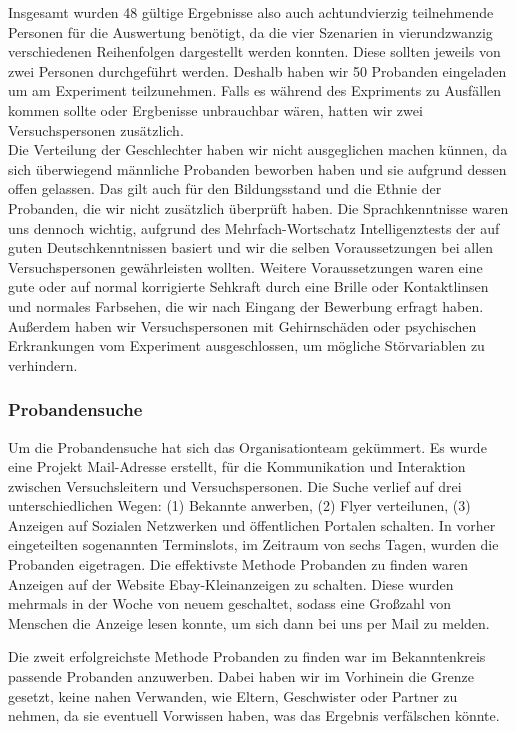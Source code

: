 \documentclass{Bericht}
\begin{document}
Insgesamt wurden 48 gültige Ergebnisse also auch achtundvierzig teilnehmende Personen für die Auswertung benötigt, da die vier Szenarien in vierundzwanzig verschiedenen Reihenfolgen dargestellt werden konnten. Diese sollten jeweils von zwei Personen durchgeführt werden. Deshalb haben wir 50 Probanden eingeladen um am Experiment teilzunehmen. Falls es während des Expriments zu Ausfällen kommen sollte oder Ergbenisse unbrauchbar wären, hatten wir zwei Versuchspersonen zusätzlich. \\

Die Verteilung der Geschlechter haben wir nicht ausgeglichen machen künnen, da sich überwiegend männliche Probanden beworben haben und sie aufgrund dessen offen gelassen. Das gilt auch für den Bildungsstand und die Ethnie der Probanden, die wir nicht zusätzlich überprüft haben. Die Sprachkenntnisse waren uns dennoch wichtig, aufgrund des Mehrfach-Wortschatz Intelligenztests der auf guten Deutschkenntnissen basiert und wir die selben Voraussetzungen bei allen Versuchspersonen gewährleisten wollten. Weitere Voraussetzungen waren eine gute oder auf normal korrigierte Sehkraft durch eine Brille oder Kontaktlinsen und normales Farbsehen, die wir nach Eingang der Bewerbung erfragt haben. Außerdem haben wir Versuchspersonen mit Gehirnschäden oder psychischen Erkrankungen vom Experiment ausgeschlossen, um mögliche Störvariablen zu verhindern. 

\subsubsection{Probandensuche} 

Um die Probandensuche hat sich das Organisationteam gekümmert. Es wurde eine Projekt Mail-Adresse erstellt, für die Kommunikation und Interaktion zwischen Versuchsleitern und Versuchspersonen. Die Suche verlief auf drei unterschiedlichen Wegen: (1) Bekannte anwerben, (2) Flyer verteilunen, (3) Anzeigen auf Sozialen Netzwerken und öffentlichen Portalen schalten. In vorher eingeteilten sogenannten \glqq Terminslots\grqq{}, im Zeitraum von sechs Tagen, wurden die Probanden eigetragen. Die effektivste Methode Probanden zu finden waren Anzeigen auf der Website \glqq Ebay-Kleinanzeigen\grqq{} zu schalten. Diese wurden mehrmals in der Woche von neuem geschaltet, sodass eine Großzahl von Menschen die Anzeige lesen konnte, um sich dann bei uns per Mail zu melden.

Die zweit erfolgreichste Methode Probanden zu finden war im Bekanntenkreis passende Probanden anzuwerben. Dabei haben wir im Vorhinein die Grenze gesetzt, keine nahen Verwanden, wie Eltern, Geschwister oder Partner zu nehmen, da sie eventuell Vorwissen haben, was das Ergebnis verfälschen könnte.
\end{document}

